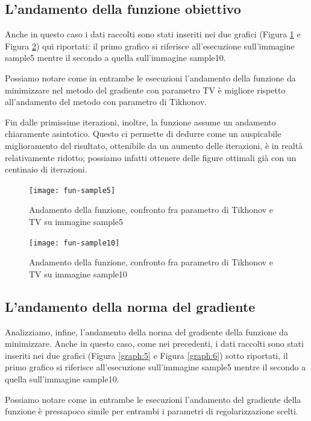 \documentclass[12pt]{article}
\begin{document}
    \newpage
    \subsection{L'andamento della funzione obiettivo}
    Anche in questo caso i dati raccolti sono stati inseriti nei due grafici (Figura \ref{graph:3} e Figura \ref{graph:4}) qui riportati: il primo grafico si riferisce all'esecuzione sull'immagine sample5 mentre il secondo a quella sull'immagine sample10.

    Possiamo notare come in entrambe le esecuzioni l'andamento della funzione da minimizzare nel metodo del gradiente con parametro TV è migliore rispetto all'andamento del metodo con parametro di Tikhonov.

    Fin dalle primissime iterazioni, inoltre, la funzione assume un andamento chiaramente asintotico.
    Questo ci permette di dedurre come un auspicabile miglioramento del risultato,  ottenibile da un aumento delle iterazioni, è in realtà relativamente ridotto; possiamo infatti ottenere delle figure ottimali già con un centinaio di iterazioni.

    \begin{figure}[h!]
    \centering
    \texttt{[image: fun-sample5]}
    \caption{Andamento della funzione, confronto fra parametro di Tikhonov e TV su immagine sample5}
    \label{graph:3}
    \end{figure}

    \begin{figure}[h!]
    \centering
    \texttt{[image: fun-sample10]}
    \caption{Andamento della funzione, confronto fra parametro di Tikhonov e TV su immagine sample10}
    \label{graph:4}
    \end{figure}

\cleardoublepage

\cleardoublepage
    \subsection{L'andamento della norma del gradiente}
    Analizziamo, infine, l'andamento della norma del gradiente della funzione da minimizzare. Anche in questo caso, come nei precedenti, i dati raccolti sono stati inseriti nei due grafici (Figura \ref{graph:5} e Figura \ref{graph:6}) sotto riportati, il primo grafico si riferisce all'esecuzione sull'immagine sample5 mentre il secondo a quella sull'immagine sample10.


    Possiamo notare come in entrambe le esecuzioni l'andamento del gradiente della funzione è pressapoco simile per entrambi i parametri di regolarizzazione scelti.
\end{document}
